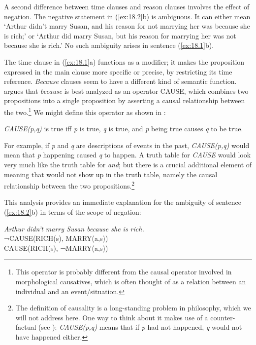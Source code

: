 A second difference between time clauses and reason clauses involves the effect of negation. The negative statement in (\ref{ex:18.2}b) is ambiguous. It can either mean ‘Arthur didn’t marry Susan, and his reason for not marrying her was because she is rich;’ or ‘Arthur did marry Susan, but his reason for marrying her was not because she is rich.’ No such ambiguity arises in sentence (\ref{ex:18.1}b).



The time clause in (\ref{ex:18.1}a) functions as a modifier; it makes the proposition expressed in the main clause more specific or precise, by restricting its time reference. \textit{Because} clauses seem to have a different kind of semantic function. \citet{Johnston1994} argues that \textit{because} is best analyzed as an operator CAUSE, which combines two propositions into a single proposition by asserting a causal relationship between the two.\footnote{This operator is probably different from the causal operator involved in morphological causatives, which is often thought of as a relation between an individual and an event/situation.} We might define this operator as shown in :


\ea \label{ex:18.4}
\textit{CAUSE(p,q)} is true iff \textit{p} is true, \textit{q} is true, and \textit{p} being true causes \textit{q} to be true.
\z


For example, if \textit{p} and \textit{q} are descriptions of events in the past, \textit{CAUSE(p,q)} would mean that \textit{p} happening caused \textit{q} to happen. A truth table for \textit{CAUSE} would look very much like the truth table for \textit{and}; but there is a crucial additional element of meaning that would not show up in the truth table, namely the causal relationship between the two propositions.\footnote{The definition of causality is a long-standing problem in philosophy, which we will not address here. One way to think about it makes use of a counter-factual (see ): \textit{CAUSE(p,q)} means that if \textit{p} had not happened, \textit{q} would not have happened either.}



This analysis provides an immediate explanation for the ambiguity of sentence (\ref{ex:18.2}b) in terms of the scope of negation:


\ea \label{ex:18.5}
  \textit{Arthur didn’t marry Susan because she is rich.}\\
\ea  ¬CAUSE(RICH(s), MARRY(a,s))\\
\ex CAUSE(RICH(s), ¬MARRY(a,s))
                       \z
\z


